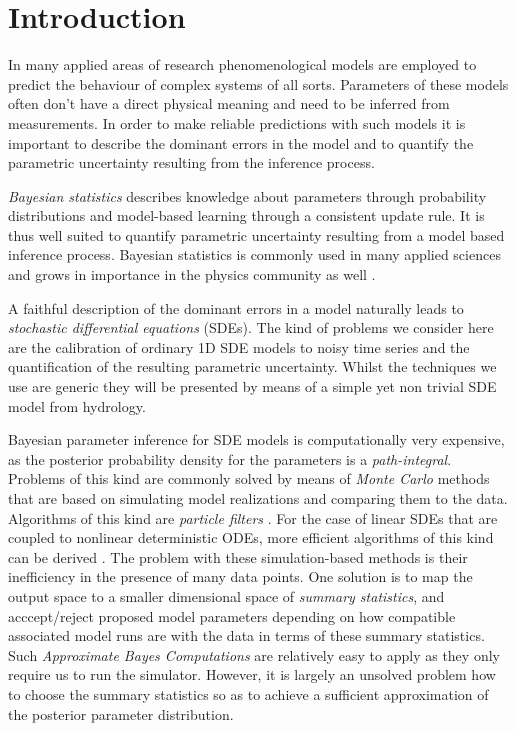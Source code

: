 \documentclass[12pt,a4paper,final]{iopart}
\begin{document}
\section{Introduction}

In many applied areas of research phenomenological models are employed to predict the behaviour of complex systems of all sorts.
Parameters of these models often don't have a direct physical meaning and need to be inferred from measurements.
In order to make reliable predictions with such models it is important to describe the dominant errors in the model and to quantify the parametric uncertainty resulting from the inference process.

{\em Bayesian statistics} describes knowledge about parameters through probability distributions and model-based learning through a consistent update rule. It is thus well suited to quantify parametric uncertainty resulting from a model based inference process.
Bayesian statistics is commonly used in many applied sciences and grows in importance in the physics community as well \cite{vonToussaint2011bayesian}.

A faithful description of the dominant errors in a model naturally leads to {\em stochastic differential equations} (SDEs).
The kind of problems we consider here are the calibration of ordinary 1D SDE models to noisy time series and the quantification of the resulting parametric uncertainty.
Whilst the techniques we use are generic they will be presented by means of a simple yet non trivial SDE model from hydrology.

Bayesian parameter inference for SDE models is computationally very expensive, as the posterior probability density for the parameters is a {\em path-integral}.
Problems of this kind are commonly solved by means of {\em Monte Carlo} methods that are based on simulating model realizations and comparing them to the data. Algorithms of this kind are {\em particle filters} \cite{chopin_2013_SMC2}. For the case of linear SDEs that are coupled to nonlinear deterministic ODEs, more efficient algorithms of this kind can be derived \cite{tomassini_2009_smoothing, reichert_2009_timedepParameters}.
The problem with these simulation-based methods is their inefficiency in the presence of many data points.
One solution is to map the output space to a smaller dimensional space of {\em summary statistics}, and acccept/reject proposed model parameters depending on how compatible associated model runs are with the data in terms of these summary statistics.
Such {\em Approximate Bayes Computations} \cite{Albert_2013_ABC} are relatively easy to apply as they only require us to run the simulator. However, it is largely an unsolved problem how to choose the summary statistics so as to achieve a sufficient approximation of the posterior parameter distribution.
\end{document}
